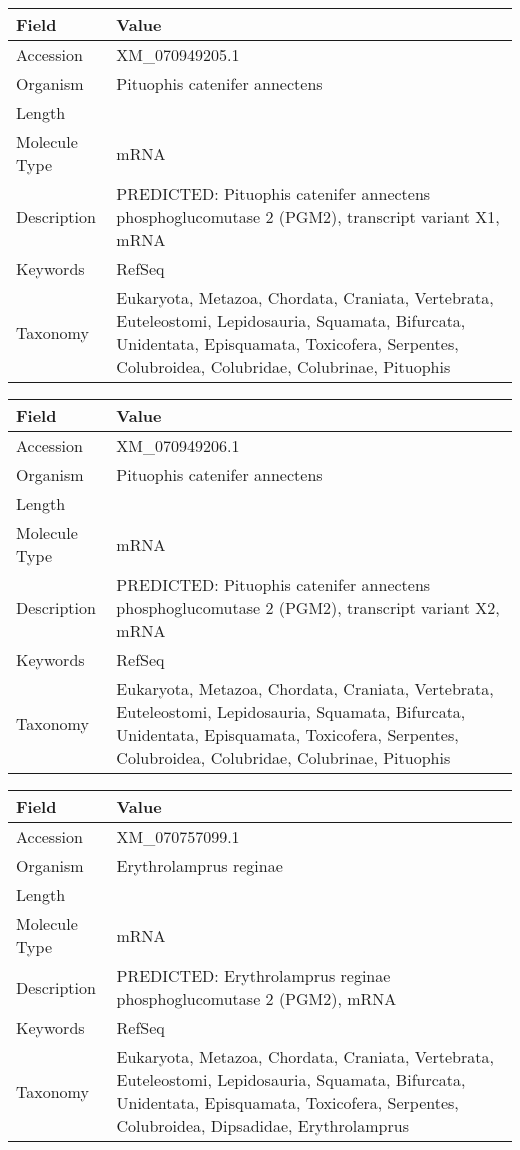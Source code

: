 \documentclass[10pt]{article}
\begin{document}
{\footnotesize
\begin{longtable}{>{\raggedright\arraybackslash}p{4.5cm} >{\raggedright\arraybackslash}p{11.5cm}}
\textbf{Field} & \textbf{Value} \\
\hline
Accession & XM\_070949205.1 \\
Organism & Pituophis catenifer annectens \\
Length & 2030 \\
Molecule Type & mRNA \\
Description & PREDICTED: Pituophis catenifer annectens phosphoglucomutase 2 (PGM2), transcript variant X1, mRNA \\
Keywords & RefSeq \\
Taxonomy & Eukaryota, Metazoa, Chordata, Craniata, Vertebrata, Euteleostomi, Lepidosauria, Squamata, Bifurcata, Unidentata, Episquamata, Toxicofera, Serpentes, Colubroidea, Colubridae, Colubrinae, Pituophis \\
\end{longtable}
}

{\footnotesize
\begin{longtable}{>{\raggedright\arraybackslash}p{4.5cm} >{\raggedright\arraybackslash}p{11.5cm}}
\textbf{Field} & \textbf{Value} \\
\hline
Accession & XM\_070949206.1 \\
Organism & Pituophis catenifer annectens \\
Length & 1892 \\
Molecule Type & mRNA \\
Description & PREDICTED: Pituophis catenifer annectens phosphoglucomutase 2 (PGM2), transcript variant X2, mRNA \\
Keywords & RefSeq \\
Taxonomy & Eukaryota, Metazoa, Chordata, Craniata, Vertebrata, Euteleostomi, Lepidosauria, Squamata, Bifurcata, Unidentata, Episquamata, Toxicofera, Serpentes, Colubroidea, Colubridae, Colubrinae, Pituophis \\
\end{longtable}
}

{\footnotesize
\begin{longtable}{>{\raggedright\arraybackslash}p{4.5cm} >{\raggedright\arraybackslash}p{11.5cm}}
\textbf{Field} & \textbf{Value} \\
\hline
Accession & XM\_070757099.1 \\
Organism & Erythrolamprus reginae \\
Length & 2045 \\
Molecule Type & mRNA \\
Description & PREDICTED: Erythrolamprus reginae phosphoglucomutase 2 (PGM2), mRNA \\
Keywords & RefSeq \\
Taxonomy & Eukaryota, Metazoa, Chordata, Craniata, Vertebrata, Euteleostomi, Lepidosauria, Squamata, Bifurcata, Unidentata, Episquamata, Toxicofera, Serpentes, Colubroidea, Dipsadidae, Erythrolamprus \\
\end{longtable}
}
\end{document}
